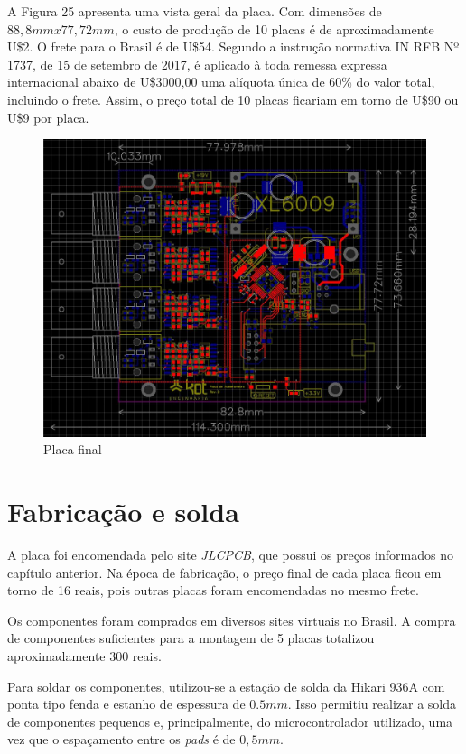 \documentclass[11pt]{abntex2}
\begin{document}
				A Figura 25 apresenta uma vista geral da placa. Com dimensões de
				$88,8mmx77,72mm$, o custo de produção de 10 placas é de
				aproximadamente U\$2. O frete para o Brasil é de U\$54. Segundo
				a instrução normativa IN RFB Nº 1737, de 15 de setembro de 2017,
				é aplicado à toda remessa expressa internacional abaixo de
				U\$3000,00 uma alíquota única de 60\% do valor total, incluindo
				o frete. Assim, o preço total de 10 placas ficariam em torno de
				U\$90 ou U\$9 por placa.

				\begin{figure}[!ht]
					\centering
					\includegraphics[width=\linewidth]{../Fotos/placaTotal.jpg}
					\caption{Placa final}
				\end{figure}

		\chapter{Fabricação e solda}
			A placa foi encomendada pelo site \textit{JLCPCB}, que possui os
			preços informados no capítulo anterior. Na época de fabricação, o
			preço final de cada placa ficou em torno de 16 reais, pois outras
			placas foram encomendadas no mesmo frete.

			Os componentes foram comprados em diversos sites virtuais no Brasil.
			A compra de componentes suficientes para a montagem de 5 placas
			totalizou aproximadamente 300 reais.

			Para soldar os componentes, utilizou-se a estação de solda da Hikari
			936A com ponta tipo fenda e estanho de espessura de $0.5mm$. Isso
			permitiu realizar a solda de componentes pequenos e, principalmente,
			do microcontrolador utilizado, uma vez que o espaçamento entre os
			\textit{pads} é de $0,5mm$.
\end{document}
